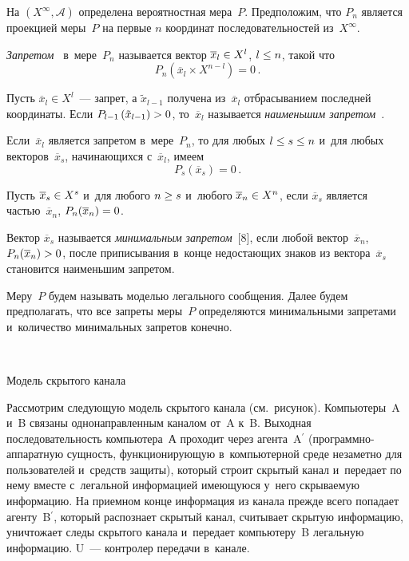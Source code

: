 \begin{multicols}{2}
  На $(X^\infty, \mathcal{A})$ определена вероятностная мера~$P$.
Предположим, что $P_n$ является проекцией меры~$P$ на первые $n$
координат последовательностей из~$X^\infty$.

  \textit{Запретом}~\cite{4-gr, 5-gr} в~мере~$P_n$ называется вектор
$\overline{x}_l\hm\in X^l$, $l\hm\leq n$, такой что
  $$
  P_n\left( \overline{x}_l\times X^{n-l}\right)=0\,.
  $$

  Пусть $\overline{x}_l\in X^l$~--- запрет, а $\tilde{x}_{l-1}$ получена
из~$\overline{x}_l$ отбрасыванием последней координаты. Если $P_{l-
1}\left(\tilde{x}_{l-1}\right)\hm>0$, то~$\overline{x}_l$ называется
\textit{наименьшим запретом}~\cite{4-gr, 5-gr}.

  Если~$\overline{x}_l$ является запретом в~мере~$P_n$, то для любых
$l\hm\leq s\hm\leq n$ и~для любых векторов~$\overline{x}_s$, начинающихся
с~$\overline{x}_l$, имеем
  $$
  P_s\left( \overline{x}_s\right)=0\,.
  $$

  Пусть $\overline{x}_s\hm\in X^s$ и~для любого $n\hm\geq s$ и~любого
$\overline{x}_n\hm\in X^n$, если $\overline{x}_s$ является
частью~$\overline{x}_n$, $P_n(\overline{x}_n)\hm=0$.

   Вектор $\overline{x}_s$ называется \textit{минимальным запретом}~[8], если
любой вектор~$\overline{x}_n$, $P_n(\overline{x}_n)\hm>0$, после
приписывания в~конце недостающих знаков из вектора~$\overline{x}_s$
становится наименьшим запретом.

  Меру~$P$ будем называть моделью легального сообщения. Далее будем
предполагать, что все запреты меры~$P$ определяются минимальными
запретами и~количество минимальных запретов конечно.

\vspace*{6pt}
 \begin{center}
 \mbox{%
 \epsfxsize=74.148mm
 }

\vspace*{3pt}

 {\small{Модель скрытого канала}}
  \end{center}

  \vspace*{9pt}


  Рассмотрим следующую модель скрытого канала (см.\ рисунок).
Компьютеры~A и~B связаны однонаправленным каналом от~A к~B. Выходная
последовательность компьютера~А проходит через \mbox{агента}~A$^\prime$
  (про\-грам\-мно-ап\-па\-рат\-ную сущность, функционирующую
в~компьютерной среде незаметно для пользователей и~средств защиты),
который строит скрытый канал и~передает по нему вместе с~легальной
информацией имеющуюся у~него скрываемую информацию. На приемном
конце информация из канала прежде всего попадает агенту~B$^\prime$,
который распознает скрытый канал, считывает скрытую информацию,
уничтожает следы скрытого канала и~передает компьютеру~B легальную
информацию. U~--- контролер передачи в~канале.




\end{multicols}
